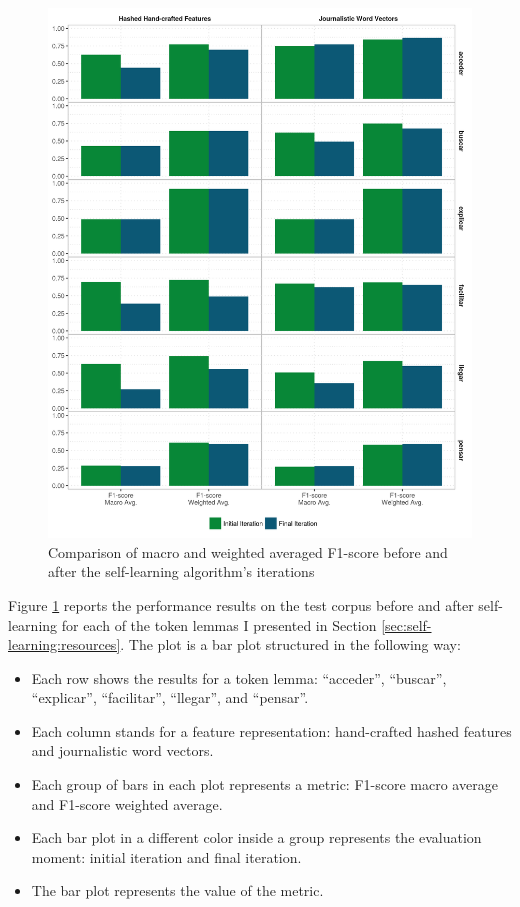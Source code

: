 \begin{figure}[htb!]
  \centering
  \includegraphics[height=.9\textheight,width=\textwidth,keepaspectratio]
    {plots/selflearning/test_results}
  \caption{Comparison of macro and weighted averaged F1-score before and after
  the self-learning algorithm's iterations}
  \label{fig:self-learning:test_performance}
\end{figure}

Figure \ref{fig:self-learning:test_performance} reports the performance results
on the test corpus before and after self-learning for each of the token lemmas
I presented in Section \ref{sec:self-learning:resources}. The plot is a bar
plot structured in the following way:

\begin{itemize}
  \item Each row shows the results for a token lemma: ``acceder'', ``buscar'',
    ``explicar'', ``facilitar'', ``llegar'', and ``pensar''.
  \item Each column stands for a feature representation: hand-crafted hashed
    features and journalistic word vectors.
  \item Each group of bars in each plot represents a metric: F1-score macro
    average and F1-score weighted average.
  \item Each bar plot in a different color inside a group represents the
    evaluation moment: initial iteration and final iteration.
  \item The bar plot represents the value of the metric.
\end{itemize}

